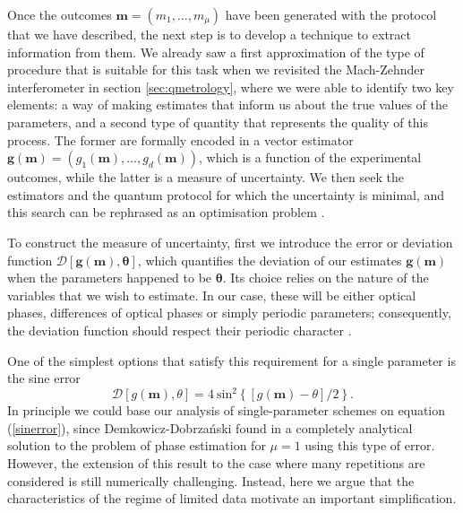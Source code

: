 Once the outcomes ${\boldsymbol{m}}=(m_1, \dots, m_\mu)$ have been generated with the protocol that we have described, the next step is to develop a technique to extract information from them. We already saw a first approximation of the type of procedure that is suitable for this task when we revisited the Mach-Zehnder interferometer in section \ref{sec:qmetrology}, where we were able to identify two key elements: a way of making estimates that inform us about the true values of the parameters, and a second type of quantity that represents the quality of this process. The former are formally encoded in a vector estimator $\boldsymbol{g}(\boldsymbol{m}) = ( g_1(\boldsymbol{m}), \dots, g_d (\boldsymbol{m}))$, which is a function of the experimental outcomes, while the latter is a measure of uncertainty. We then seek the estimators and the quantum protocol for which the uncertainty is minimal, and this search can be rephrased as an optimisation problem \cite{jaynes2003}.

To construct the measure of uncertainty, first we introduce the error or deviation function $\mathcal{D} [\boldsymbol{g}({\boldsymbol{m}}),\boldsymbol{\theta}]$, which quantifies the deviation of our estimates $\boldsymbol{g}(\boldsymbol{m})$ when the parameters happened to be $\boldsymbol{\theta}$. Its choice relies on the nature of the variables that we wish to estimate. In our case, these will be either optical phases, differences of optical phases or simply periodic parameters; consequently, the deviation function should respect their periodic character \cite{helstrom1976, holevo2011, berry2015, kolodynski2014}. 

One of the simplest options that satisfy this requirement for a single parameter is the sine error \cite{demkowicz2011, kolodynski2014, rafal2015}
\begin{equation}
\mathcal{D} [g({\boldsymbol{m}}),\theta] = 4~\mathrm{sin}^2\left\lbrace\left[g(\boldsymbol{m})-\theta\right]/2\right\rbrace.
\label{sinerror}
\end{equation}
In principle we could base our analysis of single-parameter schemes on equation (\ref{sinerror}), since Demkowicz-Dobrza\ifmmode {}\else \'{n}\fi{}ski found in \cite{demkowicz2011} a completely analytical solution to the problem of phase estimation for $\mu = 1$ using this type of error. However, the extension of this result to the case where many repetitions are considered is still numerically challenging. Instead, here we argue that the characteristics of the regime of limited data motivate an important simplification. 

